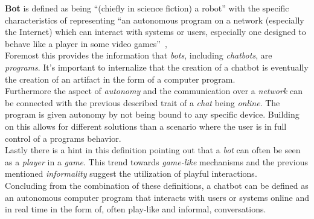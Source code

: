 \textbf{Bot} is defined as being ``(chiefly in science fiction) a robot'' with the specific characteristics of representing ``an autonomous program on a network (especially the Internet) which can interact with systems or users, especially one designed to behave like a player in some video games''~\cite{oxfordbot},
\\

Foremost this provides the information that \emph{bots}, including \emph{chatbots}, are \emph{programs}.
It's important to internalize that the creation of a chatbot is eventually the creation of an artifact in the form of a computer program.
\\

Furthermore the aspect of \emph{autonomy} and the communication over a \emph{network} can be connected with the previous described trait of a \emph{chat} being \emph{online}.
The program is given autonomy by not being bound to any specific device.
Building on this allows for different solutions than a scenario where the user is in full control of a programs behavior.
\\

Lastly there is a hint in this definition pointing out that a \emph{bot} can often be seen as a \emph{player} in a \emph{game}.
This trend towards \emph{game-like} mechanisms and the previous mentioned \emph{informality} suggest the utilization of playful interactions.
\\

Concluding from the combination of these definitions, a chatbot can be defined as an autonomous computer program that interacts with users or systems online and in real time in the form of, often play-like and informal, conversations.
